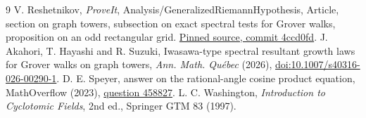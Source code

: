 \documentclass[10pt]{article}
\begin{document}
\begin{thebibliography}{9}
 V. Reshetnikov, \emph{ProveIt}, Analysis/GeneralizedRiemannHypothesis,
Article, section on graph towers, subsection on exact spectral tests for
Grover walks, proposition on an odd rectangular grid.
\href{https://github.com/VladimirReshetnikov/ProveIt/blob/4ccd0fdeda0b1cc316d2dfdccfdbcfea9d4b77fb/Analysis/GeneralizedRiemannHypothesis/Article/sections/gra.tex}{Pinned source, commit 4ccd0fd}.
 J. Akahori, T. Hayashi and R. Suzuki, Iwasawa-type spectral
resultant growth laws for Grover walks on graph towers, \emph{Ann. Math.
Qu\'ebec} (2026), \href{https://doi.org/10.1007/s40316-026-00290-1}{doi:10.1007/s40316-026-00290-1}.
 D. E. Speyer, answer on the rational-angle cosine product
equation, MathOverflow (2023),
\href{https://mathoverflow.net/questions/458827}{question 458827}.
 L. C. Washington, \emph{Introduction to Cyclotomic
Fields}, 2nd ed., Springer GTM 83 (1997).
\end{thebibliography}
\end{document}

